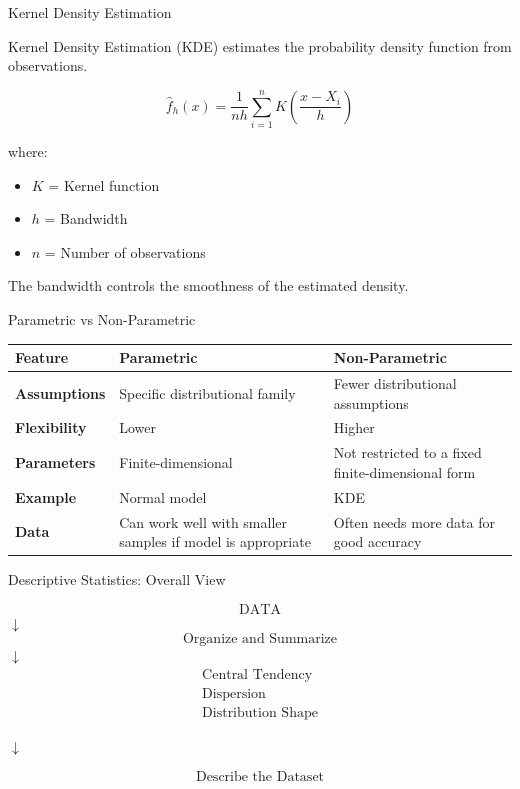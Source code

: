 \documentclass[aspectratio=169]{beamer}
\begin{document}
\begin{frame}{Kernel Density Estimation}

Kernel Density Estimation (KDE) estimates the probability
density function from observations.

\[
\boxed{
\hat f_h(x)
=
\frac{1}{nh}
\sum_{i=1}^{n}
K\left(
\frac{x-X_i}{h}
\right)
}
\]

where:

\begin{itemize}
    \item $K$ = Kernel function
    \item $h$ = Bandwidth
    \item $n$ = Number of observations
\end{itemize}

The bandwidth controls the smoothness of the estimated density.
\end{frame}

\begin{frame}{Parametric vs Non-Parametric}

\begin{center}
\begin{tabular}{>{\bfseries}m{3.3cm} m{3.5cm} m{3.5cm}}
\toprule
Feature & Parametric & Non-Parametric\\
\midrule
Assumptions & Specific distributional family & Fewer distributional assumptions\\
Flexibility & Lower & Higher\\
Parameters & Finite-dimensional & Not restricted to a fixed finite-dimensional form\\
Example & Normal model & KDE\\
Data & Can work well with smaller samples if model is appropriate & Often needs more data for good accuracy\\
\bottomrule
\end{tabular}
\end{center}
\end{frame}

\begin{frame}{Descriptive Statistics: Overall View}
\begin{center}
\[
\boxed{\text{DATA}}
\]
$\downarrow$
\[
\boxed{\text{Organize and Summarize}}
\]
$\downarrow$
\[
\boxed{
\begin{array}{c}
\text{Central Tendency}\\
\text{Dispersion}\\
\text{Distribution Shape}
\end{array}
}
\]

$\downarrow$

\[
\boxed{\text{Describe the Dataset}}
\]
\end{center}
\end{frame}
\end{document}
